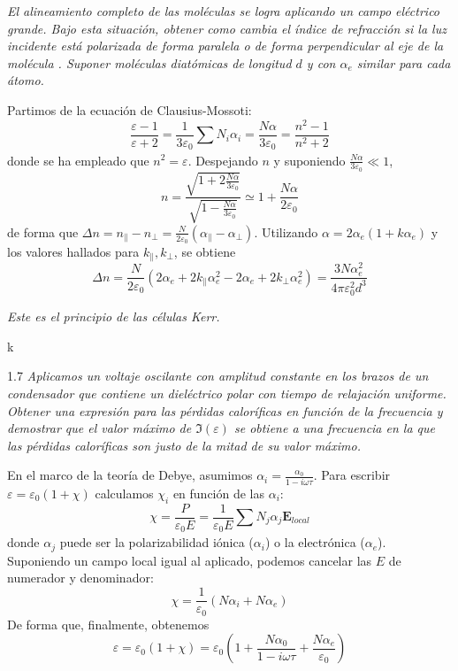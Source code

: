 \documentclass{tufte-book}
\begin{document}
\begin{tcolorbox}[halign=left]
  \emph{
    El alineamiento completo de las moléculas se logra aplicando un
    campo eléctrico grande. Bajo esta situación, obtener como cambia
    el índice de refracción si la luz incidente está polarizada de
    forma paralela o de forma perpendicular  al eje de la molécula .
    Suponer moléculas diatómicas de longitud $d$ y con $α_e$ similar
    para cada átomo.
  }
\end{tcolorbox}
Partimos de la ecuación de Clausius-Mossoti:
\begin{equation}
  \frac{ε-1}{ε+2} = \frac{1}{3ε_0} \sum_{} N_i α_i = \frac{Nα}{3ε_0} =
  \frac{n^2 - 1}{n^2 +2}
\end{equation}
donde se ha empleado que $n^2 = ε$. Despejando $n$ y suponiendo
$\frac{Nα}{3ε_0}≪1$,
\begin{equation}
  n = \frac
    {  \sqrt{ 1+2 \frac{Nα}{3ε_0}  }  }
    {    \sqrt{   1 -\frac{Nα}{3ε_0}}  }  ≃ 1 + \frac{Nα}{2ε_0}
\end{equation}
de forma que $Δn = n_∥ - n_⟂ = \frac{N}{2ε_0}(α_∥-α_\perp)$.
Utilizando $α=2α_e(1+kα_e)$ y los valores hallados para $k_∥,k_⟂$, se
obtiene
\begin{equation}
  Δn = \frac{N}{2ε_0} (2α_e + 2k_∥α_e^2 - 2α_e + 2k_⟂α_e^2) = \frac{3Nα_e^2}{4πε_0^2d^3}
\end{equation}

\begin{tcolorbox}[halign=left]
  \emph{
    Este es el principio de las células Kerr.
  }
\end{tcolorbox}
k


\begin{tcolorbox}[halign=left]
  \lettrine[lines=2]{\color{ExerciseNumberColor}1.7}{}
  \emph{
    Aplicamos un voltaje oscilante con amplitud constante en los
    brazos de un condensador que contiene un dieléctrico polar con
    tiempo de relajación uniforme. Obtener una expresión para las
    pérdidas caloríficas en función de la frecuencia y demostrar que
    el valor máximo de $\Im(ε)$ se obtiene a una frecuencia en la que las
    pérdidas caloríficas son justo de la mitad de su valor máximo.
  }
\end{tcolorbox}
En el marco de la teoría de Debye, asumimos $α_i = \frac{α_0}{1-iωτ}$.
Para escribir $ε=ε_0(1+χ)$ calculamos $χ_i$ en función de las $α_i$:
\begin{equation}
  χ  = \frac{P}{ε_0 E} = \frac{1}{ε_0 E} \sum_{} N_j α_j \symbf{E}_\mathit{local}
\end{equation}
donde $α_j$ puede ser la polarizabilidad iónica ($α_i$) o la electrónica ($α_e$).
Suponiendo un campo local igual al aplicado, podemos cancelar las $E$
de numerador y denominador:
\begin{equation}
  χ = \frac{1}{ε_0} (Nα_i + Nα_e)
\end{equation}
De forma que, finalmente, obtenemos
\begin{equation}
  ε = ε_0(1+χ) = ε_0 \left( 1+\frac{Nα_0}{1-iωτ} + \frac{Nα_e}{ε_0}
  \right)
\end{equation}
\end{document}
